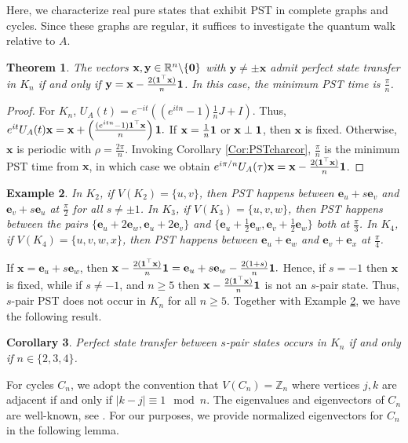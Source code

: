 \documentclass[11pt]{article}
\newtheorem{theorem}{Theorem}
\newtheorem{corollary}[theorem]{Corollary}
\newtheorem{example}[theorem]{Example}
\newcommand{\zero}{{\bf{0}}}
\newcommand{\ones}{{\bf{1}}}
\newcommand{\be}{\mathbf e}
\newcommand{\bx}{\mathbf x}
\newcommand{\by}{\mathbf y}
\def\R{\mathbb{R}}
\begin{document}
Here, we characterize real pure states that exhibit PST in complete graphs and cycles. Since these graphs are regular, it suffices to investigate the quantum walk relative to $A$.

\begin{theorem}
\label{Thm:pstkn}
The vectors $\bx,\by\in\R^n\backslash\{\zero\}$ with $\by\neq \pm\bx$ admit perfect state transfer in $K_n$ if and only if $\by=\bx-\frac{2(\ones ^\top\bx)}{n}\ones$. In this case, the minimum PST time is $\frac{\pi}{n}$.
\end{theorem}

\begin{proof}
For $K_n$, $U_A(t)=e^{-it}\left((e^{itn}-1)\frac{1}{n}J+I\right).$ Thus, $e^{it}U_A(t)\bx=\bx+\left(\frac{(e^{itn}-1)\ones^\top\bx}{n}\right)\ones.$ If $\bx=\frac{1}{n}\ones$ or $\bx\perp \ones$, then $\bx$ is fixed. Otherwise, $\bx$ is periodic with $\rho=\frac{2\pi}{n}$. Invoking Corollary \ref{Cor:PSTcharcor}, $\frac{\pi}{n}$ is the minimum PST time from $\bx$, in which case we obtain $e^{i\pi/n}U_A(\tau)\bx=\bx-\frac{2(\ones ^\top\bx)}{n}\ones$.
\end{proof}

\begin{example}
\label{Ex:Kn}
In $K_2$, if $V(K_2)=\{u,v\}$, then PST happens between $\be_u+s\be_v$ and $\be_v+s\be_u$ at $\frac{\pi}{2}$ for all $s\neq \pm 1$.
In $K_3$, if $V(K_3)=\{u,v,w\}$, then PST happens between the pairs $\{\be_u+2\be_w,\be_u+2\be_v\}$ and $\{\be_u+\frac{1}{2}\be_w,\be_v+\frac{1}{2}\be_w\}$ both at $\frac{\pi}{3}$. In $K_4$, if $V(K_4)=\{u,v,w,x\}$, then PST happens between $\be_u+\be_w$ and $\be_v+\be_x$ at $\frac{\pi}{4}$.
\end{example}

If
$\bx=\be_u+s\be_w$, then $\bx-\frac{2(\ones ^\top\bx)}{n}\ones 
=\be_u+s\be_w-\frac{2(1+s)}{n}\ones.$ Hence, if $s=-1$ then $\bx$ is fixed, while if $s\neq -1$, and $n \ge 5$ then $\bx-\frac{2(\ones ^\top\bx)}{n}\ones $ is not an $s$-pair state. Thus, $s$-pair PST does not occur in $K_n$ for all $n\geq 5$. Together with Example \ref{Ex:Kn}, we have the following result.

\begin{corollary}
Perfect state transfer between $s$-pair states occurs in $K_n$ if and only if $n\in\{2,3,4\}$.
\end{corollary}

For cycles $C_n$, we adopt the convention that $V(C_n)=\mathbb{Z}_n$ where vertices $j, k$ are adjacent if and only if $|k-j| \equiv 1 \mod n.$ The eigenvalues and eigenvectors of $C_n$ are well-known, see \cite[Section 1.4.3]{brouwer2011spectra}. For our purposes, we provide normalized eigenvectors for $C_n$ in the following lemma.
\end{document}
